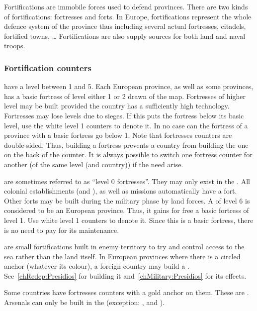 \aparag Fortifications are immobile forces used to defend provinces. There are
two kinds of fortifications: fortresses and forts. In Europe, fortifications
represent the whole defence system of the province thus including several
actual fortresses, citadels, fortified towns, \ldots
\bparag Fortifications are also supply sources for both land and naval troops.

\subsubsection{Fortification counters}
\aparag[Fortresses] have a level between 1 and 5.
\bparag Each European province, as well as some \ROTW provinces, has a basic
fortress of level either 1 or 2 drawn of the map.
\bparag Fortresses of higher level may be built provided the country has a
sufficiently high technology.
\bparag Fortresses may lose levels due to sieges. If this puts the fortress
below its basic level, use the white level 1 counters to denote it. In no case
can the fortress of a province with a basic fortress go below 1.
\bparag Note that fortresses counters are double-sided. Thus, building a
fortress prevents a country from building the one on the back of the
counter. It is always possible to switch one fortress counter for another (of
the same level (and country)) if the need arise.

\aparag[Forts] are sometimes referred to as ``level 0 fortresses''. They may
only exist in the \ROTW.
\bparag All colonial establishments (\COL and \TP), as well as missions
automatically have a fort.
\bparag Other forts may be built during the military phase by land forces.
\bparag A \COL of level 6 is considered to be an European province. Thus, it
gains for free a basic fortress of level 1. Use white level 1 counters to
denote it. Since this is a basic fortress, there is no need to pay for its
maintenance.

\aparag[\Presidios] are small fortifications built in enemy territory to try
and control access to the sea rather than the land itself.
\bparag In European provinces where there is a circled anchor (whatever its
colour), a foreign country may build a
\Presidio. See~\ref{chRedep:Presidios} for building it
and~\ref{chMilitary:Presidios} for its effects.

\aparag[Arsenals.] Some countries have fortresses counters with a gold anchor
on them. These are .
\bparag Arsenals can only be built in the \ROTW (exception:
,  and
).

